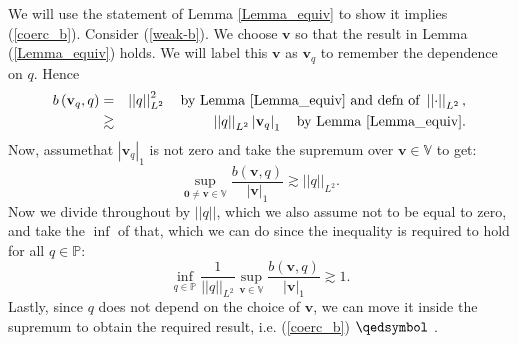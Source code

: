 \documentclass[12pt,a4paper]{article}
\theoremstyle{definition}
\begin{document}
We will use the statement of Lemma \ref{Lemma_equiv} to show it implies (\ref{coerc_b}).  Consider (\ref{weak-b}).  We choose $\textbf{v}$ so that the result in Lemma (\ref{Lemma_equiv}) holds. We will label this $\textbf{v}$ as $\textbf{v}_q$ to remember the dependence on $q$.   Hence
\begin{eqnarray}
b\left(\textbf{v}_q,q\right) &=& \left|\left|q\right|\right|_{L^2}^2 \quad\text{by Lemma \ref{Lemma_equiv}  and defn of } \nonumber \left|\left|\cdot\right|\right|_{L^2},\\
&\gtrsim& \left|\left|q\right|\right|_{L^2} \left|\textbf{v}_q\right|_1\quad \text{by Lemma \ref{Lemma_equiv}}.\nonumber
\end{eqnarray}
Now, assumethat $\left|\textbf{v}_q\right|_1$ is not zero and take the supremum over $\textbf{v}\in \mathbb{V}$ to get:
\begin{equation}
\sup_{\textbf{0}\neq\textbf{v}\in \mathbb{V}}\frac{b\left(\textbf{v},q\right)}{\left|\textbf{v}\right|_1} \gtrsim \left|\left|q\right|\right|_{L^2}.\nonumber
\end{equation}
Now we divide throughout by $\left|\left|q\right|\right|$, which we also assume not to be equal to zero, and take the $\inf$ of that, which we can do since the inequality is required to hold for all $q\in \mathbb{P}$:
\begin{equation}
\inf_{q\in \mathbb{P}}\frac{1}{\left|\left|q\right|\right|_{L^2}}\sup_{\textbf{v}\in \mathbb{V}}\frac{b\left(\textbf{v},q\right)}{\left|\textbf{v}\right|_1} \gtrsim 1 \nonumber.
\end{equation}
Lastly, since $q$ does not depend on the choice of $\textbf{v}$, we can move it inside the supremum to obtain the required result, i.e. (\ref{coerc_b}) $\qedsymbol$ .  
\end{document}
